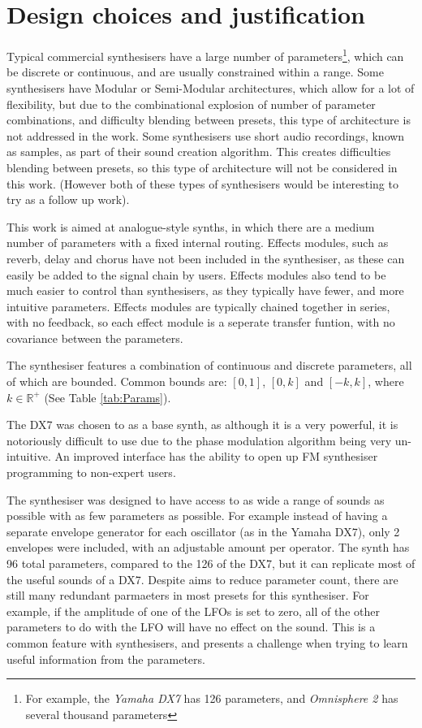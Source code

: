 \documentclass[11pt, oneside]{report}   	%
\begin{document}
\section{Design choices and justification}
Typical commercial synthesisers have a large number of parameters\footnote{For example, the \emph{Yamaha DX7} has 126 parameters, and  \emph{Omnisphere 2} has several thousand parameters}, which can be discrete or continuous, and are usually constrained within a range. Some synthesisers have Modular or Semi-Modular architectures, which allow for a lot of flexibility, but due to the combinational explosion of number of parameter combinations, and difficulty blending between presets, this type of architecture is not addressed in the work.
Some synthesisers use short audio recordings, known as samples, as part of their sound creation algorithm. This creates difficulties blending between presets, so this type of architecture will not be considered in this work. (However both of these types of synthesisers would be interesting to try as a follow up work).

This work is aimed at analogue-style synths, in which there are a medium number of parameters with a fixed internal routing. Effects modules, such as reverb, delay and chorus have not been included in the synthesiser, as these can easily be added to the signal chain by users. Effects modules also tend to be much easier to control than synthesisers, as they typically have fewer, and more intuitive parameters. Effects modules are typically chained together in series, with no feedback, so each effect module is a seperate transfer funtion, with no covariance between the parameters.

The synthesiser features a combination of continuous and discrete parameters, all of which are bounded. Common bounds are: $[0, 1]$, $[0, k]$ and $[-k, k]$, where $k \in \mathbb{R}^+ $ (See Table \ref{tab:Params}).

The DX7 was chosen to as a base synth, as although it is a very powerful, it is notoriously difficult to use due to the phase modulation algorithm being very un-intuitive. An improved interface has the ability to open up FM synthesiser programming to non-expert users. %

The synthesiser was designed to have access to as wide a range of sounds as possible with as few parameters as possible. For example instead of having a separate envelope generator for each oscillator (as in the Yamaha DX7), only 2 envelopes were included, with an adjustable amount per operator. The synth has 96 total parameters, compared to the 126 of the DX7, but it can replicate most of the useful sounds of a DX7. Despite aims to reduce parameter count, there are still many redundant parmaeters in most presets for this synthesiser. For example, if the amplitude of one of the LFOs is set to zero, all of the other parameters to do with the LFO will have no effect on the sound. This is a common feature with synthesisers, and presents a challenge when trying to learn useful information from the parameters.
\end{document}
